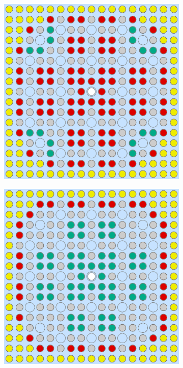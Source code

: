 \begin{figure}[h!]
\begin{subfigure}{0.48\textwidth}
  \caption{}
  \label{fig:chap10-assm-16-combined-2}
\end{subfigure}
\begin{subfigure}{0.48\textwidth}
  \centering
  \includegraphics[width=0.9\linewidth]{figures/unsupervised/geometries/with-features/4-clusters/pinch/assm-16}
  \caption{}
  \label{fig:chap10-assm-16-pinch-4}
\end{subfigure}%
\begin{subfigure}{0.48\textwidth}
  \centering
  \includegraphics[width=0.9\linewidth]{figures/unsupervised/geometries/with-features/4-clusters/combined/assm-16}

\end{subfigure}
\end{figure}
